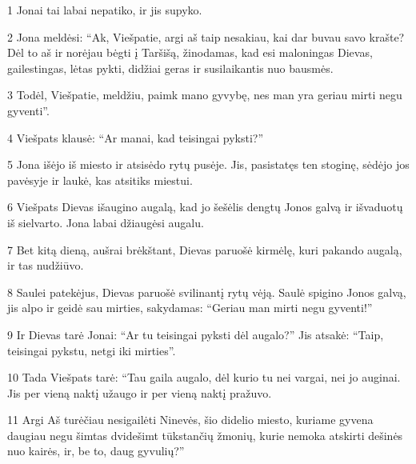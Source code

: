 \par 1 Jonai tai labai nepatiko, ir jis supyko. 
\par 2 Jona meldėsi: “Ak, Viešpatie, argi aš taip nesakiau, kai dar buvau savo krašte? Dėl to aš ir norėjau bėgti į Taršišą, žinodamas, kad esi maloningas Dievas, gailestingas, lėtas pykti, didžiai geras ir susilaikantis nuo bausmės. 
\par 3 Todėl, Viešpatie, meldžiu, paimk mano gyvybę, nes man yra geriau mirti negu gyventi”. 
\par 4 Viešpats klausė: “Ar manai, kad teisingai pyksti?” 
\par 5 Jona išėjo iš miesto ir atsisėdo rytų pusėje. Jis, pasistatęs ten stoginę, sėdėjo jos pavėsyje ir laukė, kas atsitiks miestui. 
\par 6 Viešpats Dievas išaugino augalą, kad jo šešėlis dengtų Jonos galvą ir išvaduotų iš sielvarto. Jona labai džiaugėsi augalu. 
\par 7 Bet kitą dieną, aušrai brėkštant, Dievas paruošė kirmėlę, kuri pakando augalą, ir tas nudžiūvo. 
\par 8 Saulei patekėjus, Dievas paruošė svilinantį rytų vėją. Saulė spigino Jonos galvą, jis alpo ir geidė sau mirties, sakydamas: “Geriau man mirti negu gyventi!” 
\par 9 Ir Dievas tarė Jonai: “Ar tu teisingai pyksti dėl augalo?” Jis atsakė: “Taip, teisingai pykstu, netgi iki mirties”. 
\par 10 Tada Viešpats tarė: “Tau gaila augalo, dėl kurio tu nei vargai, nei jo auginai. Jis per vieną naktį užaugo ir per vieną naktį pražuvo. 
\par 11 Argi Aš turėčiau nesigailėti Ninevės, šio didelio miesto, kuriame gyvena daugiau negu šimtas dvidešimt tūkstančių žmonių, kurie nemoka atskirti dešinės nuo kairės, ir, be to, daug gyvulių?”




